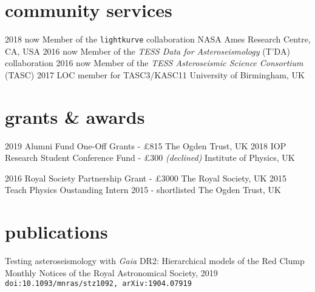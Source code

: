 \documentclass[]{k-cv} %
\begin{document}
\clearpage
{}

\section{community services}
\begin{entrylist}
\entrythree
{2018 \to now}
{Member of the \texttt{lightkurve} collaboration}
{NASA Ames Research Centre, CA, USA}
\entrythree
{2016 \to now}
{Member of the \emph{TESS Data for Asteroseismology} (T'DA) collaboration }
{}
\entrythree
{2016 \to now}
{Member of the \emph{TESS Asteroseismic Science Consortium} (TASC)}
{}
\entrythree
{2017}
{LOC member for TASC3/KASC11}
{University of Birmingham, UK}
\end{entrylist}



\section{grants \& awards}

\begin{entrylist}
\entrythree
{2019}
{Alumni Fund One-Off Grants - \pounds 815}
{The Ogden Trust, UK}
\entrythree
{2018}
{IOP Research Student Conference Fund - \pounds 300 \emph{(declined)}}
{Institute of Physics, UK}

\entrythree
{2016}
{Royal Society Partnership Grant - \pounds 3000}
{The Royal Society, UK}
\entrythree
{2015}
{Teach Physics Oustanding Intern 2015 - shortlisted}
{The Ogden Trust, UK}

\end{entrylist}

\section{publications}
{Testing asteroseismology with \textit{Gaia} DR2: Hierarchical models of the Red Clump}
{Monthly Notices of the Royal Astronomical Society, 2019}
{\texttt{doi:10.1093/mnras/stz1092, arXiv:1904.07919}}
\end{document}
